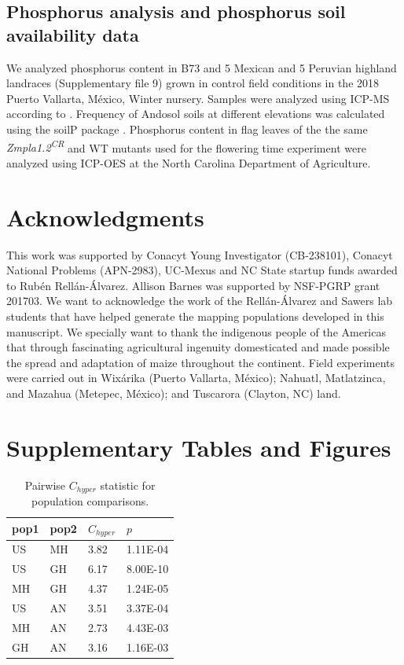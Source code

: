 \documentclass[9pt,twocolumn,twoside]{BioRxiv}
\begin{document}
\subsection{Phosphorus analysis and phosphorus soil availability data}
We analyzed phosphorus content in B73 and 5 Mexican  and 5 Peruvian highland landraces (Supplementary file 9) grown in control field conditions in the 2018 Puerto Vallarta, México, Winter nursery. 
Samples were analyzed using ICP-MS according to \cite{Baxter2014-ch}. 
Frequency of Andosol soils at different elevations was calculated using the soilP package \cite{Rodriguez-Zapata2018-vz}.
Phosphorus content in flag leaves of the the same \textit{Zmpla1.2\textsuperscript{CR}} and WT mutants used for the flowering time experiment were analyzed using ICP-OES at the North Carolina Department of Agriculture.   

\section{Acknowledgments}
This work was supported by Conacyt Young Investigator (CB-238101), Conacyt National Problems (APN-2983), UC-Mexus and NC State startup funds awarded to Rubén Rellán-Álvarez. Allison Barnes was supported by NSF-PGRP grant 201703.
We want to acknowledge the work of the Rellán-Álvarez and Sawers lab students that have helped generate the mapping populations developed in this manuscript.
We specially want to thank the indigenous people of the Americas that through fascinating agricultural ingenuity domesticated and made possible the spread and adaptation of maize throughout the continent. 
Field experiments were carried out in Wixárika (Puerto Vallarta, México); Nahuatl, Matlatzinca, and Mazahua (Metepec, México); and Tuscarora (Clayton, NC) land.
\label{sec:acknowledgments}



\clearpage

\onecolumn

\section*{Supplementary Tables and Figures}

\begin{table}[h!]

\centering
\begin{tabular}{@{}llll@{}}
\toprule
pop1 & pop2 & $C_{hyper}$   & $p$  \\ \midrule
US   & MH   & 3.82 & 1.11E-04 \\
US   & GH   & 6.17 & 8.00E-10 \\
MH   & GH   & 4.37 & 1.24E-05 \\
US   & AN   & 3.51 & 3.37E-04 \\
MH   & AN   & 2.73 & 4.43E-03 \\
GH   & AN   & 3.16 & 1.16E-03 \\ \bottomrule
\end{tabular}
\label{tab:table1}
\caption{Pairwise $C_{hyper}$ statistic for population comparisons.}
\end{table}
\end{document}
